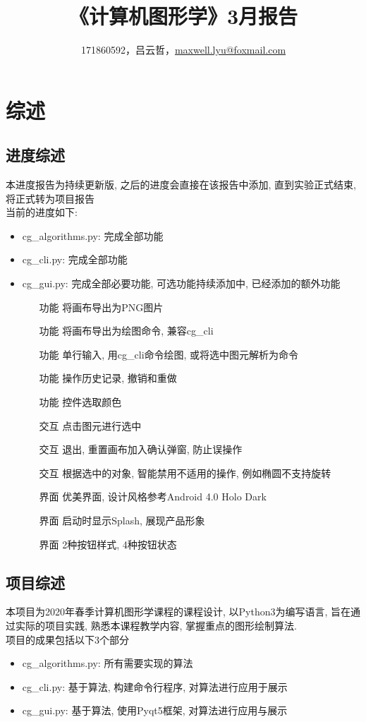\documentclass[a4paper,UTF8]{article}
\theoremstyle{definition}
\begin{document}
\title{\textbf{《计算机图形学》3月报告}}
\author{171860592，吕云哲，\href{mailto:maxwell.lyu@foxmail.com}{maxwell.lyu@foxmail.com}}
\maketitle

\section{综述}
\subsection{进度综述}
  本进度报告为持续更新版, 之后的进度会直接在该报告中添加, 直到实验正式结束, 将正式转为项目报告\\
  当前的进度如下: 
  \begin{itemize}
    \item cg\_algorithms.py: 完成全部功能
    \item cg\_cli.py: 完成全部功能
    \item cg\_gui.py: 完成全部必要功能, 可选功能持续添加中, 已经添加的额外功能
    \begin{itemize}
      \item [功能]将画布导出为PNG图片
      \item [功能]将画布导出为绘图命令, 兼容cg\_cli
      \item [功能]单行输入, 用cg\_cli命令绘图, 或将选中图元解析为命令
      \item [功能]操作历史记录, 撤销和重做
      \item [功能]控件选取颜色
      \item [交互]点击图元进行选中
      \item [交互]退出, 重置画布加入确认弹窗, 防止误操作
      \item [交互]根据选中的对象, 智能禁用不适用的操作, 例如椭圆不支持旋转
      \item [界面]优美界面, 设计风格参考Android 4.0 Holo Dark
      \item [界面]启动时显示Splash, 展现产品形象
      \item [界面]2种按钮样式, 4种按钮状态
    \end{itemize}
  \end{itemize}
\subsection{项目综述}
  本项目为2020年春季计算机图形学课程的课程设计, 以Python3为编写语言, 旨在通过实际的项目实践, 熟悉本课程教学内容, 掌握重点的图形绘制算法.\\
  项目的成果包括以下3个部分
  \begin{itemize}
    \item cg\_algorithms.py: 所有需要实现的算法
    \item cg\_cli.py: 基于算法, 构建命令行程序, 对算法进行应用于展示
    \item cg\_gui.py: 基于算法, 使用Pyqt5框架, 对算法进行应用与展示
  \end{itemize}
\end{document}
